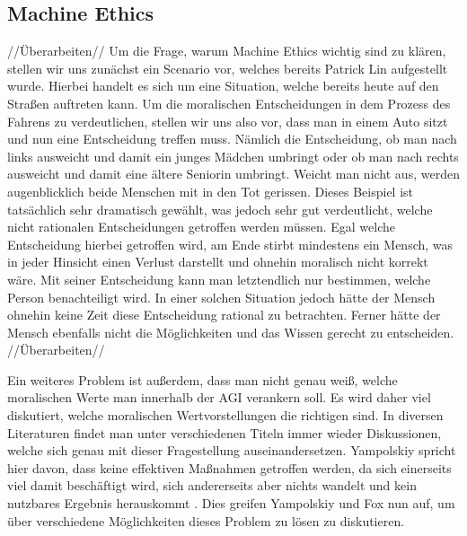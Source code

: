     \subsection{Machine Ethics}
    //Überarbeiten//    
    Um die Frage, warum Machine Ethics wichtig sind zu klären, stellen wir uns zunächst ein
    Scenario vor, welches bereits Patrick Lin \cite[p. 70]{maurer_gerdes_lenz_winner_2015}
    aufgestellt wurde. Hierbei handelt es sich um eine Situation, welche bereits heute auf den
    Straßen auftreten kann. Um die moralischen Entscheidungen in dem Prozess des Fahrens zu
    verdeutlichen, stellen wir uns also vor, dass man in einem Auto sitzt und nun eine 
    Entscheidung treffen muss. Nämlich die Entscheidung, ob man nach links ausweicht und damit
    ein junges Mädchen umbringt oder ob man nach rechts ausweicht und damit eine ältere 
    Seniorin umbringt. Weicht man nicht aus, werden augenblicklich beide Menschen mit in den
    Tot gerissen. Dieses Beispiel ist tatsächlich sehr dramatisch gewählt, was jedoch sehr gut
    verdeutlicht, welche nicht rationalen Entscheidungen getroffen werden müssen. Egal welche 
    Entscheidung hierbei getroffen wird, am Ende stirbt mindestens ein Mensch, was in jeder 
    Hinsicht einen Verlust darstellt und ohnehin moralisch nicht korrekt wäre. \cite[p. 70]{maurer_gerdes_lenz_winner_2015}
    Mit seiner Entscheidung kann man letztendlich nur bestimmen, welche Person benachteiligt 
    wird. In einer solchen Situation jedoch hätte der Mensch ohnehin keine Zeit diese Entscheidung
    rational zu betrachten. Ferner hätte der Mensch ebenfalls nicht die Möglichkeiten und 
    das Wissen gerecht zu entscheiden.
    //Überarbeiten// 
    
    Ein weiteres Problem ist außerdem, dass man nicht genau weiß, welche moralischen Werte man
    innerhalb der AGI verankern soll. \cite[p. 1]{yampolskiy2013safety} Es wird daher viel 
    diskutiert, welche moralischen Wertvorstellungen die richtigen sind. In diversen Literaturen
    findet man unter verschiedenen Titeln immer wieder Diskussionen, welche sich genau mit dieser
    Fragestellung auseinandersetzen. Yampolskiy spricht hier davon, dass keine effektiven 
    Maßnahmen getroffen werden, da sich einerseits viel damit beschäftigt wird, sich andererseits 
    aber nichts wandelt und kein nutzbares Ergebnis herauskommt \cite[p. 1]{yampolskiy2013safety}.
    Dies greifen Yampolskiy und Fox nun auf, um über verschiedene Möglichkeiten dieses Problem zu
    lösen zu diskutieren. 
    
